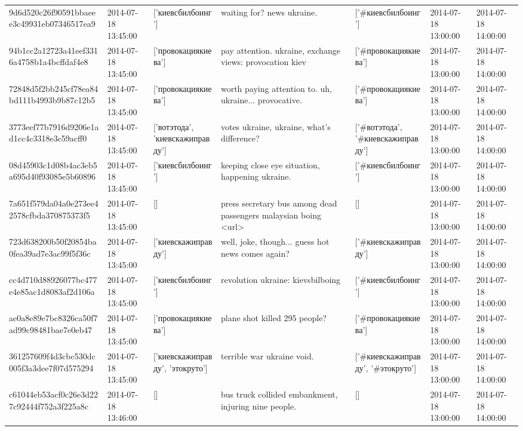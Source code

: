 \begin{tabular}{lllllll}
9d6d520c26f90591bbaeee3c49931eb07346517ea9 & 2014-07-18 13:45:00 & ['киевсбилбоинг'] & waiting for? news ukraine. & ['#киевсбилбоинг'] & 2014-07-18 13:00:00 & 2014-07-18 14:00:00 \\
94b1cc2a12723a41eef3316a4758b1a4bcffdaf4e8 & 2014-07-18 13:45:00 & ['провокациякиева'] & pay attention. ukraine, exchange views: provocation kiev & ['#провокациякиева'] & 2014-07-18 13:00:00 & 2014-07-18 14:00:00 \\
72848d5f2bb245cf78ea84bd111b4993b9b87c12b5 & 2014-07-18 13:45:00 & ['провокациякиева'] & worth paying attention to. uh, ukraine... provocative. & ['#провокациякиева'] & 2014-07-18 13:00:00 & 2014-07-18 14:00:00 \\
3773eef77b7916d9206e1ad1cc4c3318e3c59acff0 & 2014-07-18 13:45:00 & ['вотэтода', 'киевскажиправду'] & votes ukraine, ukraine, what's difference? & ['#вотэтода', '#киевскажиправду'] & 2014-07-18 13:00:00 & 2014-07-18 14:00:00 \\
08d45903c1d08b4ac3eb5a695d40f93085e5b60896 & 2014-07-18 13:45:00 & ['киевсбилбоинг'] & keeping close eye situation, happening ukraine. & ['#киевсбилбоинг'] & 2014-07-18 13:00:00 & 2014-07-18 14:00:00 \\
7a651f579da04a0e273ee42578cfbda370875373f5 & 2014-07-18 13:45:00 & [] & press secretary bus among dead passengers malaysian boing <url> & [] & 2014-07-18 13:00:00 & 2014-07-18 14:00:00 \\
723d638200b50f20854ba0fea39ad7e3ac99f5f36c & 2014-07-18 13:45:00 & ['киевскажиправду'] & well, joke, though... guess hot news comes again? & ['#киевскажиправду'] & 2014-07-18 13:00:00 & 2014-07-18 14:00:00 \\
cc4d710d88926077bc477e4e85ac1d8083af2d106a & 2014-07-18 13:45:00 & ['киевсбилбоинг'] & revolution ukraine: kievsbilboing & ['#киевсбилбоинг'] & 2014-07-18 13:00:00 & 2014-07-18 14:00:00 \\
ae0a8e89e7bc8326ca50f7ad99c98481bae7e0eb47 & 2014-07-18 13:45:00 & ['провокациякиева'] & plane shot killed 295 people? & ['#провокациякиева'] & 2014-07-18 13:00:00 & 2014-07-18 14:00:00 \\
361257609f4d3cbc530dc005f3a3dee7f07d575294 & 2014-07-18 13:45:00 & ['киевскажиправду', 'этокруто'] & terrible war ukraine void. & ['#киевскажиправду', '#этокруто'] & 2014-07-18 13:00:00 & 2014-07-18 14:00:00 \\
c61044eb53acf0c26e3d227c92444f752a3f225a8c & 2014-07-18 13:46:00 & [] & bus truck collided embankment, injuring nine people. & [] & 2014-07-18 13:00:00 & 2014-07-18 14:00:00 \\

\end{tabular}

